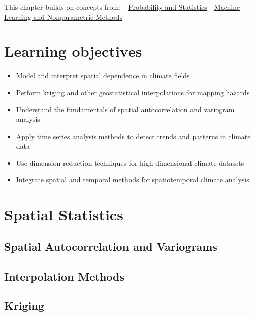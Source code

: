 \documentclass[
  letterpaper,
  DIV=11,
  numbers=noendperiod]{scrreprt}
\providecommand{\tightlist}{%
  \setlength{\itemsep}{0pt}\setlength{\parskip}{0pt}}
\begin{document}

This chapter builds on concepts from: -
\href{./chapters/fundamentals/probability-stats.qmd}{Probability and
Statistics} -
\href{./chapters/fundamentals/ml-nonparametric.qmd}{Machine Learning and
Nonparametric Methods}

\section*{Learning objectives}\label{learning-objectives-5}


\begin{itemize}
\tightlist
\item
  Model and interpret spatial dependence in climate fields
\item
  Perform kriging and other geostatistical interpolations for mapping
  hazards
\item
  Understand the fundamentals of spatial autocorrelation and variogram
  analysis
\item
  Apply time series analysis methods to detect trends and patterns in
  climate data
\item
  Use dimension reduction techniques for high-dimensional climate
  datasets
\item
  Integrate spatial and temporal methods for spatiotemporal climate
  analysis
\end{itemize}

\section{Spatial Statistics}\label{spatial-statistics}

\subsection{Spatial Autocorrelation and
Variograms}\label{spatial-autocorrelation-and-variograms}

\subsection{Interpolation Methods}\label{interpolation-methods}

\subsection{Kriging}\label{kriging}
\end{document}
